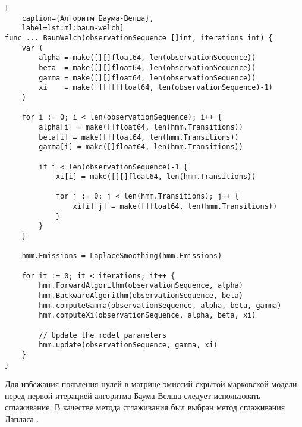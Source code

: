 \begin{lstlisting}[
	caption={Алгоритм Баума-Велша},
	label=lst:ml:baum-welch]
func ... BaumWelch(observationSequence []int, iterations int) {
	var (
		alpha = make([][]float64, len(observationSequence))
		beta  = make([][]float64, len(observationSequence))
		gamma = make([][]float64, len(observationSequence))
		xi    = make([][][]float64, len(observationSequence)-1)
	)
	
	for i := 0; i < len(observationSequence); i++ {
		alpha[i] = make([]float64, len(hmm.Transitions))
		beta[i] = make([]float64, len(hmm.Transitions))
		gamma[i] = make([]float64, len(hmm.Transitions))
		
		if i < len(observationSequence)-1 {
			xi[i] = make([][]float64, len(hmm.Transitions))
			
			for j := 0; j < len(hmm.Transitions); j++ {
				xi[i][j] = make([]float64, len(hmm.Transitions))
			}
		}
	}
	
	hmm.Emissions = LaplaceSmoothing(hmm.Emissions)
	
	for it := 0; it < iterations; it++ {
		hmm.ForwardAlgorithm(observationSequence, alpha)
		hmm.BackwardAlgorithm(observationSequence, beta)
		hmm.computeGamma(observationSequence, alpha, beta, gamma)
		hmm.computeXi(observationSequence, alpha, beta, xi)
		
		// Update the model parameters
		hmm.update(observationSequence, gamma, xi)
	}
}
\end{lstlisting}

Для избежания появления нулей в матрице эмиссий скрытой марковской модели перед первой итерацией алгоритма Баума-Велша следует использовать сглаживание. В качестве метода сглаживания был выбран метод сглаживания Лапласа \cite{smooting}.

